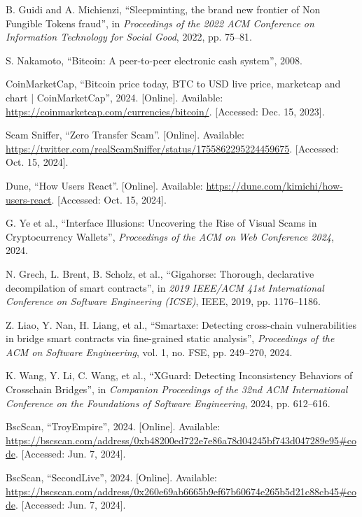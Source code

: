 \begin{thebibliography}{00}
 B. Guidi and A. Michienzi, ``Sleepminting, the brand new frontier of Non Fungible Tokens fraud'', in \textit{Proceedings of the 2022 ACM Conference on Information Technology for Social Good}, 2022, pp. 75--81.

 S. Nakamoto, ``Bitcoin: A peer-to-peer electronic cash system'', 2008.

 CoinMarketCap, ``Bitcoin price today, BTC to USD live price, marketcap and chart | CoinMarketCap'', 2024. [Online]. Available: \url{https://coinmarketcap.com/currencies/bitcoin/}. [Accessed: Dec. 15, 2023].

 Scam Sniffer, ``Zero Transfer Scam''. [Online]. Available: \url{https://twitter.com/realScamSniffer/status/1755862295224459675}. [Accessed: Oct. 15, 2024].

 Dune, ``How Users React''. [Online]. Available: \url{https://dune.com/kimichi/how-users-react}. [Accessed: Oct. 15, 2024].

 G. Ye et al., ``Interface Illusions: Uncovering the Rise of Visual Scams in Cryptocurrency Wallets'', \textit{Proceedings of the ACM on Web Conference 2024}, 2024.

 N. Grech, L. Brent, B. Scholz, et al., ``Gigahorse: Thorough, declarative decompilation of smart contracts'', in \textit{2019 IEEE/ACM 41st International Conference on Software Engineering (ICSE)}, IEEE, 2019, pp. 1176--1186.

 Z. Liao, Y. Nan, H. Liang, et al., ``Smartaxe: Detecting cross-chain vulnerabilities in bridge smart contracts via fine-grained static analysis'', \textit{Proceedings of the ACM on Software Engineering}, vol. 1, no. FSE, pp. 249--270, 2024.

 K. Wang, Y. Li, C. Wang, et al., ``XGuard: Detecting Inconsistency Behaviors of Crosschain Bridges'', in \textit{Companion Proceedings of the 32nd ACM International Conference on the Foundations of Software Engineering}, 2024, pp. 612--616.

 BscScan, ``TroyEmpire'', 2024. [Online]. Available: \url{https://bscscan.com/address/0xb48200ed722e7e86a78d04245bf743d047289e95#code}. [Accessed: Jun. 7, 2024].

 BscScan, ``SecondLive'', 2024. [Online]. Available: \url{https://bscscan.com/address/0x260e69ab6665b9ef67b60674e265b5d21c88cb45#code}. [Accessed: Jun. 7, 2024].


\end{thebibliography}
